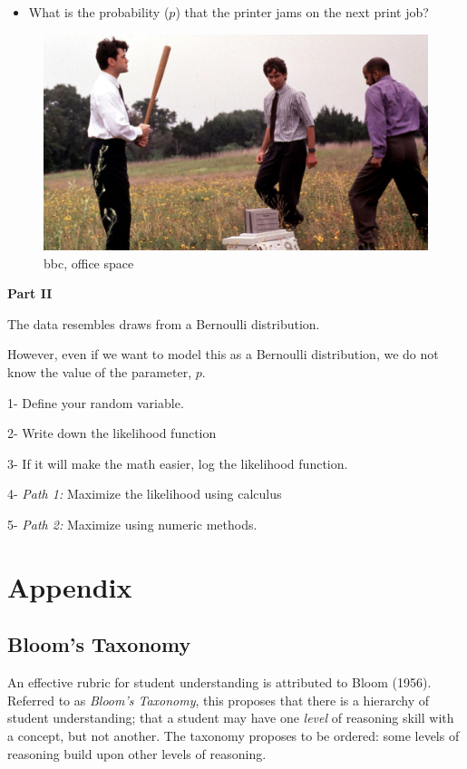 \documentclass[
]{book}
\providecommand{\tightlist}{%
  \setlength{\itemsep}{0pt}\setlength{\parskip}{0pt}}
\theoremstyle{definition}
\theoremstyle{definition}
\theoremstyle{definition}
\theoremstyle{definition}
\theoremstyle{remark}
\begin{document}
\begin{itemize}
\tightlist
\item
  What is the probability (\(p\)) that the printer jams on the next print job?
\end{itemize}

\begin{figure}
\centering
\includegraphics[width=0.8\linewidth,height=\textheight,keepaspectratio]{./images/office_space.jpg}
\caption{bbc, office space}
\end{figure}

\textbf{Part II}

The data resembles draws from a Bernoulli distribution.

However, even if we want to model this as a Bernoulli distribution, we do not know the value of the parameter, \(p\).

1- Define your random variable.

2- Write down the likelihood function

3- If it will make the math easier, log the likelihood function.

4- \emph{Path 1:} Maximize the likelihood using calculus

5- \emph{Path 2:} Maximize using numeric methods.

\chapter*{Appendix}\label{appendix}

\section*{Bloom's Taxonomy}\label{blooms-taxonomy}

An effective rubric for student understanding is attributed to Bloom (1956). Referred to as \emph{Bloom's Taxonomy}, this proposes that there is a hierarchy of student understanding; that a student may have one \emph{level} of reasoning skill with a concept, but not another. The taxonomy proposes to be ordered: some levels of reasoning build upon other levels of reasoning.
\end{document}
